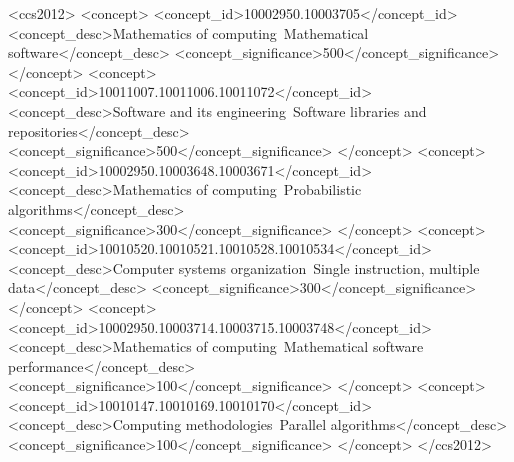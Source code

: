 \documentclass[acmsmall,screen,review]{acmart}
\theoremstyle{acmdefinition}
\begin{document}
\begin{CCSXML}
<ccs2012>
 <concept>
  <concept_id>10002950.10003705</concept_id>
  <concept_desc>Mathematics of computing~Mathematical software</concept_desc>
  <concept_significance>500</concept_significance>
 </concept>
 <concept>
  <concept_id>10011007.10011006.10011072</concept_id>
  <concept_desc>Software and its engineering~Software libraries and repositories</concept_desc>
  <concept_significance>500</concept_significance>
 </concept>
 <concept>
  <concept_id>10002950.10003648.10003671</concept_id>
  <concept_desc>Mathematics of computing~Probabilistic algorithms</concept_desc>
  <concept_significance>300</concept_significance>
 </concept>
 <concept>
  <concept_id>10010520.10010521.10010528.10010534</concept_id>
  <concept_desc>Computer systems organization~Single instruction, multiple data</concept_desc>
  <concept_significance>300</concept_significance>
 </concept>
 <concept>
  <concept_id>10002950.10003714.10003715.10003748</concept_id>
  <concept_desc>Mathematics of computing~Mathematical software performance</concept_desc>
  <concept_significance>100</concept_significance>
 </concept>
 <concept>
  <concept_id>10010147.10010169.10010170</concept_id>
  <concept_desc>Computing methodologies~Parallel algorithms</concept_desc>
  <concept_significance>100</concept_significance>
 </concept>
</ccs2012>
\end{CCSXML}




\maketitle
\end{document}
